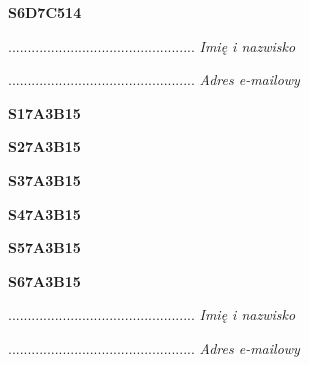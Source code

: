 \begin{turn}{90}\huge \textbf{S6D7C514}\end{turn}

\begin{turn}{90}\begin{minipage}{\linewidth} \vspace{20mm} ................................................  \textit{Imię i nazwisko}\end{minipage}\end{turn}

\begin{turn}{90}\begin{minipage}{\linewidth} \vspace{20mm} ................................................  \textit{Adres e-mailowy}\end{minipage}\end{turn}

\begin{turn}{90}\huge \textbf{S17A3B15}\end{turn}

\begin{turn}{90}\huge \textbf{S27A3B15}\end{turn}

\begin{turn}{90}\huge \textbf{S37A3B15}\end{turn}

\begin{turn}{90}\huge \textbf{S47A3B15}\end{turn}

\begin{turn}{90}\huge \textbf{S57A3B15}\end{turn}

\begin{turn}{90}\huge \textbf{S67A3B15}\end{turn}

\begin{turn}{90}\begin{minipage}{\linewidth} \vspace{20mm} ................................................  \textit{Imię i nazwisko}\end{minipage}\end{turn}

\begin{turn}{90}\begin{minipage}{\linewidth} \vspace{20mm} ................................................  \textit{Adres e-mailowy}\end{minipage}\end{turn}

